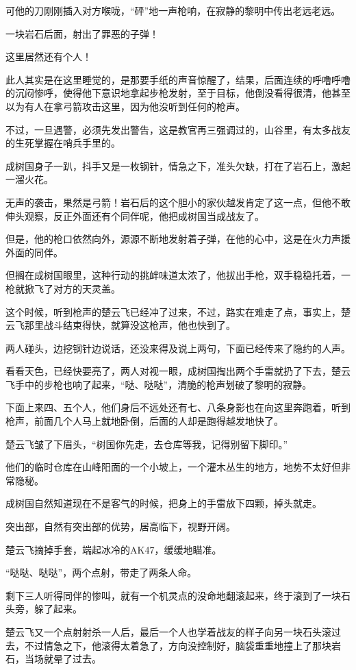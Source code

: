 可他的刀刚刚插入对方喉咙，“砰”地一声枪响，在寂静的黎明中传出老远老远。

一块岩石后面，射出了罪恶的子弹！

这里居然还有个人！

此人其实是在这里睡觉的，是那要手纸的声音惊醒了，结果，后面连续的呼噜呼噜的沉闷惨呼，使得他下意识地拿起步枪发射，至于目标，他倒没看得很清，他甚至以为有人在拿弓箭攻击这里，因为他没听到任何的枪声。

不过，一旦遇警，必须先发出警告，这是教官再三强调过的，山谷里，有太多战友的生死掌握在哨兵手里的。

成树国身子一趴，抖手又是一枚钢针，情急之下，准头欠缺，打在了岩石上，激起一溜火花。

无声的袭击，果然是弓箭！岩石后的这个胆小的家伙越发肯定了这一点，但他不敢伸头观察，反正外面还有个同伴呢，他把成树国当成战友了。

但是，他的枪口依然向外，源源不断地发射着子弹，在他的心中，这是在火力声援外面的同伴。

但搁在成树国眼里，这种行动的挑衅味道太浓了，他拔出手枪，双手稳稳托着，一枪就掀飞了对方的天灵盖。

这个时候，听到枪声的楚云飞已经冲了过来，不过，路实在难走了点，事实上，楚云飞那里战斗结束得快，就算没这枪声，他也快到了。

两人碰头，边挖钢针边说话，还没来得及说上两句，下面已经传来了隐约的人声。

看看天色，已经快要亮了，两人对视一眼，成树国掏出两个手雷就扔了下去，楚云飞手中的步枪也响了起来，“哒、哒哒”，清脆的枪声划破了黎明的寂静。

下面上来四、五个人，他们身后不远处还有七、八条身影也在向这里奔跑着，听到枪声，前面几个人马上就地卧倒，后面的人却是跑得越发地快了。

楚云飞皱了下眉头，“树国你先走，去仓库等我，记得别留下脚印。”

他们的临时仓库在山峰阳面的一个小坡上，一个灌木丛生的地方，地势不太好但非常隐秘。

成树国自然知道现在不是客气的时候，把身上的手雷放下四颗，掉头就走。

突出部，自然有突出部的优势，居高临下，视野开阔。

楚云飞摘掉手套，端起冰冷的AK47，缓缓地瞄准。

“哒哒、哒哒”，两个点射，带走了两条人命。

剩下三人听得同伴的惨叫，就有一个机灵点的没命地翻滚起来，终于滚到了一块石头旁，躲了起来。

楚云飞又一个点射射杀一人后，最后一个人也学着战友的样子向另一块石头滚过去，不过情急之下，他滚得太着急了，方向没控制好，脑袋重重地撞上了那块岩石，当场就晕了过去。

